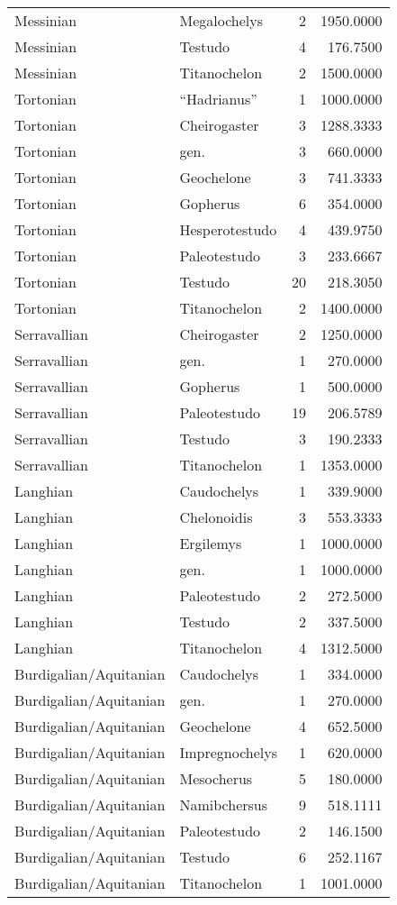 \begin{longtable}[]{@{}llrr@{}}
	Messinian & Megalochelys & 2 & 1950.0000\tabularnewline
	Messinian & Testudo & 4 & 176.7500\tabularnewline
	Messinian & Titanochelon & 2 & 1500.0000\tabularnewline
	Tortonian & ``Hadrianus'' & 1 & 1000.0000\tabularnewline
	Tortonian & Cheirogaster & 3 & 1288.3333\tabularnewline
	Tortonian & gen. & 3 & 660.0000\tabularnewline
	Tortonian & Geochelone & 3 & 741.3333\tabularnewline
	Tortonian & Gopherus & 6 & 354.0000\tabularnewline
	Tortonian & Hesperotestudo & 4 & 439.9750\tabularnewline
	Tortonian & Paleotestudo & 3 & 233.6667\tabularnewline
	Tortonian & Testudo & 20 & 218.3050\tabularnewline
	Tortonian & Titanochelon & 2 & 1400.0000\tabularnewline
	Serravallian & Cheirogaster & 2 & 1250.0000\tabularnewline
	Serravallian & gen. & 1 & 270.0000\tabularnewline
	Serravallian & Gopherus & 1 & 500.0000\tabularnewline
	Serravallian & Paleotestudo & 19 & 206.5789\tabularnewline
	Serravallian & Testudo & 3 & 190.2333\tabularnewline
	Serravallian & Titanochelon & 1 & 1353.0000\tabularnewline
	Langhian & Caudochelys & 1 & 339.9000\tabularnewline
	Langhian & Chelonoidis & 3 & 553.3333\tabularnewline
	Langhian & Ergilemys & 1 & 1000.0000\tabularnewline
	Langhian & gen. & 1 & 1000.0000\tabularnewline
	Langhian & Paleotestudo & 2 & 272.5000\tabularnewline
	Langhian & Testudo & 2 & 337.5000\tabularnewline
	Langhian & Titanochelon & 4 & 1312.5000\tabularnewline
	Burdigalian/Aquitanian & Caudochelys & 1 & 334.0000\tabularnewline
	Burdigalian/Aquitanian & gen. & 1 & 270.0000\tabularnewline
	Burdigalian/Aquitanian & Geochelone & 4 & 652.5000\tabularnewline
	Burdigalian/Aquitanian & Impregnochelys & 1 & 620.0000\tabularnewline
	Burdigalian/Aquitanian & Mesocherus & 5 & 180.0000\tabularnewline
	Burdigalian/Aquitanian & Namibchersus & 9 & 518.1111\tabularnewline
	Burdigalian/Aquitanian & Paleotestudo & 2 & 146.1500\tabularnewline
	Burdigalian/Aquitanian & Testudo & 6 & 252.1167\tabularnewline
	Burdigalian/Aquitanian & Titanochelon & 1 & 1001.0000\tabularnewline
	\bottomrule
\end{longtable}

